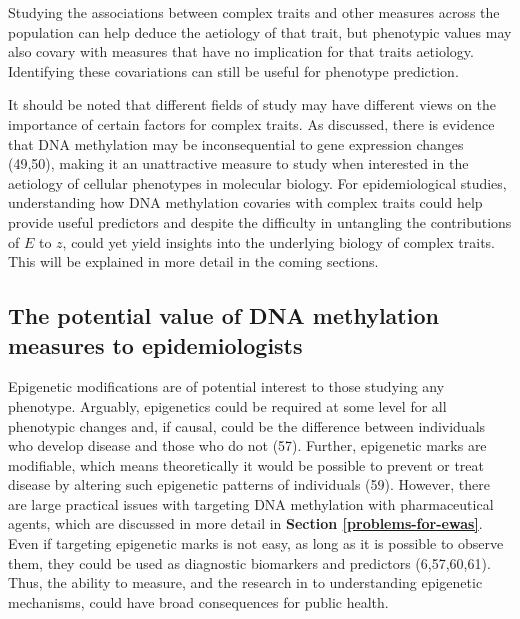 \documentclass[11pt,oneside]{bristolthesis}
\begin{document}
Studying the associations between complex traits and other measures across the population can help deduce the aetiology of that trait, but phenotypic values may also covary with measures that have no implication for that traits aetiology. Identifying these covariations can still be useful for phenotype prediction.

It should be noted that different fields of study may have different views on the importance of certain factors for complex traits. As discussed, there is evidence that DNA methylation may be inconsequential to gene expression changes (49,50), making it an unattractive measure to study when interested in the aetiology of cellular phenotypes in molecular biology. For epidemiological studies, understanding how DNA methylation covaries with complex traits could help provide useful predictors and despite the difficulty in untangling the contributions of \(E\) to \(z\), could yet yield insights into the underlying biology of complex traits. This will be explained in more detail in the coming sections.

\hypertarget{appeal-of-dnam}{%
\subsection{The potential value of DNA methylation measures to epidemiologists}\label{appeal-of-dnam}}

Epigenetic modifications are of potential interest to those studying any phenotype. Arguably, epigenetics could be required at some level for all phenotypic changes and, if causal, could be the difference between individuals who develop disease and those who do not (57). Further, epigenetic marks are modifiable, which means theoretically it would be possible to prevent or treat disease by altering such epigenetic patterns of individuals (59). However, there are large practical issues with targeting DNA methylation with pharmaceutical agents, which are discussed in more detail in \textbf{Section \ref{problems-for-ewas}}. Even if targeting epigenetic marks is not easy, as long as it is possible to observe them, they could be used as diagnostic biomarkers and predictors (6,57,60,61). Thus, the ability to measure, and the research in to understanding epigenetic mechanisms, could have broad consequences for public health.
\end{document}
